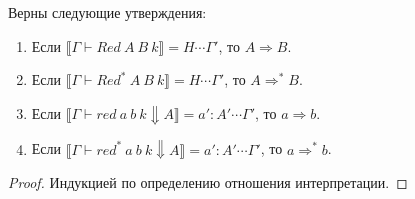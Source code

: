 \documentclass{amsart}
\theoremstyle{definition}
\theoremstyle{remark}
\newcommand{\red}{\Rightarrow}
\renewcommand{\ll}{\llbracket}
\newcommand{\rr}{\rrbracket}
\numberwithin{figure}{section}
\begin{document}
\begin{lem}
Верны следующие утверждения:
\begin{enumerate}
\item Если $\ll \Gamma \vdash Red\ A\ B\ k \rr = H \dotsb \Gamma'$, то $A \red B$.
\item Если $\ll \Gamma \vdash Red^*\ A\ B\ k \rr = H \dotsb \Gamma'$, то $A \red^* B$.
\item Если $\ll \Gamma \vdash red\ a\ b\ k \Downarrow A \rr = a' : A' \dotsb \Gamma'$, то $a \red b$.
\item Если $\ll \Gamma \vdash red^*\ a\ b\ k \Downarrow A \rr = a' : A' \dotsb \Gamma'$, то $a \red^* b$.
\end{enumerate}
\end{lem}
\begin{proof}
Индукцией по определению отношения интерпретации.
\end{proof}
\end{document}
